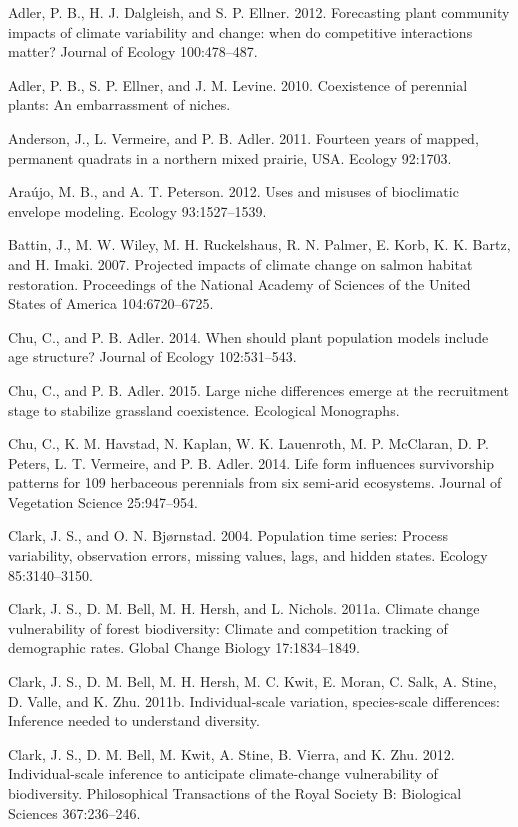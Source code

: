 \documentclass[12pt,]{article}
\begin{document}
Adler, P. B., H. J. Dalgleish, and S. P. Ellner. 2012. Forecasting plant
community impacts of climate variability and change: when do competitive
interactions matter? Journal of Ecology 100:478--487.

Adler, P. B., S. P. Ellner, and J. M. Levine. 2010. Coexistence of
perennial plants: An embarrassment of niches.

Anderson, J., L. Vermeire, and P. B. Adler. 2011. Fourteen years of
mapped, permanent quadrats in a northern mixed prairie, USA. Ecology
92:1703.

Araújo, M. B., and A. T. Peterson. 2012. Uses and misuses of bioclimatic
envelope modeling. Ecology 93:1527--1539.

Battin, J., M. W. Wiley, M. H. Ruckelshaus, R. N. Palmer, E. Korb, K. K.
Bartz, and H. Imaki. 2007. Projected impacts of climate change on salmon
habitat restoration. Proceedings of the National Academy of Sciences of
the United States of America 104:6720--6725.

Chu, C., and P. B. Adler. 2014. When should plant population models
include age structure? Journal of Ecology 102:531--543.

Chu, C., and P. B. Adler. 2015. Large niche differences emerge at the
recruitment stage to stabilize grassland coexistence. Ecological
Monographs.

Chu, C., K. M. Havstad, N. Kaplan, W. K. Lauenroth, M. P. McClaran, D.
P. Peters, L. T. Vermeire, and P. B. Adler. 2014. Life form influences
survivorship patterns for 109 herbaceous perennials from six semi-arid
ecosystems. Journal of Vegetation Science 25:947--954.

Clark, J. S., and O. N. Bjørnstad. 2004. Population time series: Process
variability, observation errors, missing values, lags, and hidden
states. Ecology 85:3140--3150.

Clark, J. S., D. M. Bell, M. H. Hersh, and L. Nichols. 2011a. Climate
change vulnerability of forest biodiversity: Climate and competition
tracking of demographic rates. Global Change Biology 17:1834--1849.

Clark, J. S., D. M. Bell, M. H. Hersh, M. C. Kwit, E. Moran, C. Salk, A.
Stine, D. Valle, and K. Zhu. 2011b. Individual-scale variation,
species-scale differences: Inference needed to understand diversity.

Clark, J. S., D. M. Bell, M. Kwit, A. Stine, B. Vierra, and K. Zhu.
2012. Individual-scale inference to anticipate climate-change
vulnerability of biodiversity. Philosophical Transactions of the Royal
Society B: Biological Sciences 367:236--246.
\end{document}
